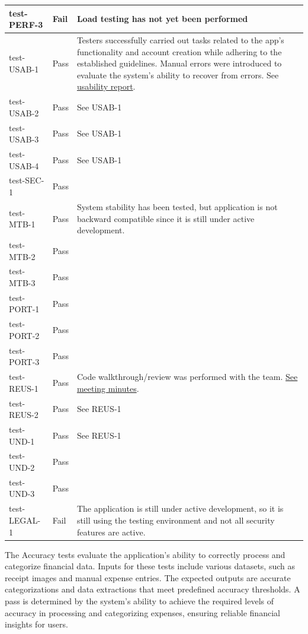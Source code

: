 \documentclass[12pt, titlepage]{article}
\begin{document}
\begin{longtable}{>{\centering\arraybackslash}p{} >{\centering\arraybackslash}p{} >{\centering\arraybackslash}p{}}
    test-PERF-3 & Fail & Load testing has not yet been performed \\
    \midrule
    test-USAB-1 & Pass & Testers successfully carried out tasks related to the
    app's functionality and account creation while adhering to the established
    guidelines. Manual errors were introduced to evaluate the system's ability
    to recover from errors. See \hyperref[sec:usability-report]{usability report}. \\
    test-USAB-2 & Pass & See USAB-1 \\
    test-USAB-3 & Pass & See USAB-1 \\
    test-USAB-4 & Pass & See USAB-1 \\
    \midrule
    test-SEC-1 & Pass &  \\
    \midrule
    test-MTB-1 & Pass & System stability has been tested, but application is not
    backward compatible since it is still under active development. \\
    test-MTB-2 & Pass &  \\
    test-MTB-3 & Pass &  \\
    \midrule
    test-PORT-1 & Pass &  \\
    test-PORT-2 & Pass &  \\
    test-PORT-3 & Pass &  \\
    \midrule
    test-REUS-1 & Pass & Code walkthrough/review was performed with the team.
    \href{https://github.com/PlutosCapstone/Plutos/issues/256}{See meeting
    minutes}. \\
    test-REUS-2 & Pass & See REUS-1 \\
    \midrule
    test-UND-1 & Pass & See REUS-1 \\
    test-UND-2 & Pass &  \\
    test-UND-3 & Pass &  \\
    \midrule
    test-LEGAL-1 & Fail & The application is still under active development, so
    it is still using the testing environment and not all security features are
    active. \\
    \bottomrule
\end{longtable}

The Accuracy tests evaluate the application's ability to correctly process and categorize 
financial data. Inputs for these tests include various datasets, such as receipt images 
and manual expense entries. The expected outputs are accurate categorizations and data 
extractions that meet predefined accuracy thresholds. A pass is determined by the 
system's ability to achieve the required levels of accuracy in processing and 
categorizing expenses, ensuring reliable financial insights for users.
\end{document}
